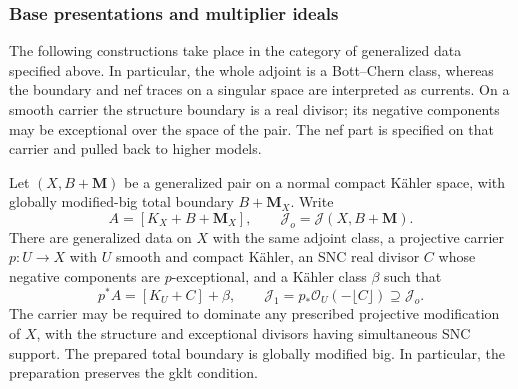 \subsubsection{Base presentations and multiplier ideals}

The following constructions take place in the category of generalized
data specified above. In particular, the whole adjoint is a
Bott--Chern class, whereas the boundary and nef traces on a singular
space are interpreted as currents. On a smooth carrier the structure
boundary is a real divisor; its negative components may be exceptional
over the space of the pair. The nef part is specified on that carrier
and pulled back to higher models.

\begin{lemma}
\label{prog:base-presentation-preparation}
Let $(X,B+\mathbf M)$ be a generalized pair on a normal compact
K\"ahler space, with globally modified-big total boundary
$B+\mathbf M_X$. Write
\[
 A=[K_X+B+\mathbf M_X],\qquad
 \mathcal J_o=\mathcal J(X,B+\mathbf M).
\]
There are generalized data on $X$ with the same adjoint class, a
projective carrier $p:U\to X$ with $U$ smooth and compact K\"ahler, an SNC real
divisor $C$ whose negative components are $p$-exceptional, and a
K\"ahler class $\beta$ such that
\begin{equation}\label{prog:base-presentation-prepared}
 p^*A=[K_U+C]+\beta,\qquad
 \mathcal J_1=p_*\mathcal O_U(-\lfloor C\rfloor)
                 \supseteq\mathcal J_o.
\end{equation}
The carrier may be required to dominate any prescribed projective
modification of $X$, with the structure and exceptional divisors
having simultaneous SNC support. The prepared total boundary is
globally modified big. In particular, the preparation preserves the
gklt condition.
\end{lemma}

